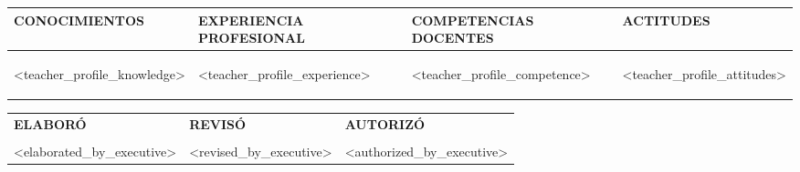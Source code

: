 \begin{enumerate}
    \begin{tabular}{|p{}|p{}|p{}|p{}|}
      \hline
      \textbf{CONOCIMIENTOS} & \textbf{EXPERIENCIA PROFESIONAL} &\textbf{COMPETENCIAS DOCENTES} & \textbf{ACTITUDES}
      \\\hline
      \begin{itemize}[leftmargin=*]
      \setlength{\itemsep}{0pt}
      \setlength{\parskip}{0pt}
      <teacher_profile_knowledge>
      \end{itemize}
      & 
      \begin{itemize}[leftmargin=*]
      \setlength{\itemsep}{0pt}
      \setlength{\parskip}{0pt}
      <teacher_profile_experience>
      \end{itemize}
      &
      \begin{itemize}[leftmargin=*]
      \setlength{\itemsep}{0pt}
      \setlength{\parskip}{0pt}
      <teacher_profile_competence>
      \end{itemize}
      & 
      \begin{itemize}[leftmargin=*]
      \setlength{\itemsep}{0pt}
      \setlength{\parskip}{0pt}
      <teacher_profile_attitudes>
      \end{itemize}
      \\\hline
    \end{tabular}
\end{enumerate}

  \begin{tabular}{p{}p{}p{}}

      \centering
      \textbf{ELABORÓ} 
      &
      \centering
      \textbf{REVISÓ} 
      &
      \centering
      \textbf{AUTORIZÓ}\\
      &&&\\

      \centering
      \hline 
      <elaborated_by_executive>
      &
      \centering
      \hline 
      <revised_by_executive>
      &
      \centering
      \hline 
       <authorized_by_executive>
  \end{tabular}

